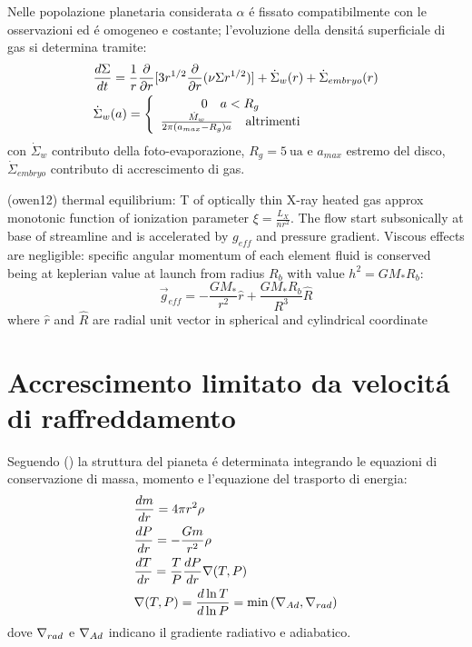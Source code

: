 Nelle popolazione planetaria considerata $\alpha$ \'e fissato compatibilmente con le osservazioni  ed \'e omogeneo e costante; l'evoluzione della densit\'a superficiale di gas si determina tramite:
\begin{align}
	&\TDy{t}{\Sigma}=\frac{1}{r}\PDof{r}[3r\expy{1/2}\PDof{r}(\nu\Sigma r\expy{1/2})]+\dot{\Sigma}_w(r)+\dot{\Sigma}_{embryo}(r)\label{eq:diskaccrphev-m18}\\
	&\dot{\Sigma}_w(a)=\left\{\begin{array}{c}0\quad a<R_g\\\frac{\dot{M}_w}{2\pi(a_{max}-R_g)a}\quad \text{altrimenti}\\\end{array}\right.
\end{align}
con $\dot{\Sigma}_w$ contributo della foto-evaporazione, $R_g=\SI{5}{\astronomicalunit}$ e $a_{max}$ estremo del disco,  $\dot{\Sigma}_{embryo}$ contributo di accrescimento di gas.


\begin{workout}
(owen12)
thermal equilibrium: T of optically thin X-ray heated gas approx monotonic function of ionization parameter $\xi=\frac{L_X}{nr^2}$. The flow start subsonically at base of streamline and is accelerated by $g_{eff}$ and pressure gradient. Viscous effects are negligible: specific angular momentum of each element fluid is conserved being at keplerian value at launch from radius $R_b$ with value $h^2=GM_*R_b$:
\[\vec{g}_{eff}=-\frac{GM_*}{r^2}\hat{r}+\frac{GM_*R_b}{R^3}\hat{R}\]
where $\hat{r}$ and $\hat{R}$ are radial unit vector in spherical and cylindrical coordinate
\end{workout}

\section{Accrescimento limitato da velocit\'a di raffreddamento}

Seguendo (\cite{mordasini2012characterization}) la struttura del pianeta \'e determinata integrando le equazioni di conservazione di massa, momento e l'equazione del trasporto di energia:
\begin{align}
&\TDy{r}{m}=4\pi r^2\rho\\
&\TDy{r}{P}=-\frac{Gm}{r^2}\rho\\
&\TDy{r}{T}=\frac{T}{P}\TDy{r}{P}\nabla(T,P)\\
&\nabla(T,P)=\TDly{P}{T}=\min{(\nad{},\nrad{})}\\
\end{align}
dove $\nrad{}$ e $\nad{}$ indicano il gradiente radiativo e adiabatico.

